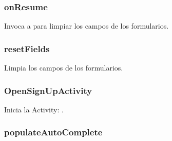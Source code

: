 \documentclass[letterpaper,10pt,english]{sphinxmanual}
\begin{document}
\subsubsection{onResume}
\label{Fragments/SignUpFragment:onresume}

\begin{fulllineitems}
\label{Fragments/SignUpFragment:com.fiuba.tallerii.jobify.SignUpFragment.onResume()}
Invoca a  para limpiar los campos de los formularios.

\end{fulllineitems}



\subsubsection{resetFields}
\label{Fragments/SignUpFragment:resetfields}

\begin{fulllineitems}
\label{Fragments/SignUpFragment:com.fiuba.tallerii.jobify.SignUpFragment.resetFields()}
Limpia los campos de los formularios.

\end{fulllineitems}



\subsubsection{OpenSignUpActivity}
\label{Fragments/SignUpFragment:opensignupactivity}

\begin{fulllineitems}
\label{Fragments/SignUpFragment:com.fiuba.tallerii.jobify.SignUpFragment.OpenSignUpActivity()}
Inicia la Activity: .

\end{fulllineitems}



\subsubsection{populateAutoComplete}
\label{Fragments/SignUpFragment:populateautocomplete}
\end{document}
